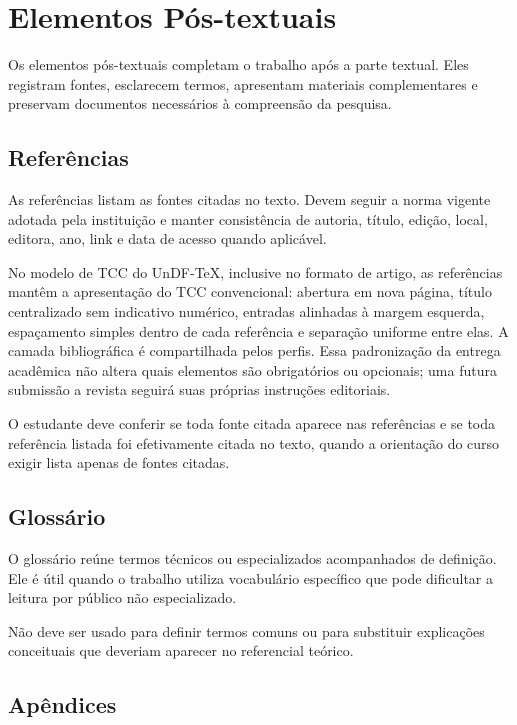 \chapter{Elementos Pós-textuais}

Os elementos pós-textuais completam o trabalho após a parte textual. Eles registram fontes, esclarecem termos, apresentam materiais complementares e preservam documentos necessários à compreensão da pesquisa.

\section{Referências}

As referências listam as fontes citadas no texto. Devem seguir a norma vigente adotada pela instituição e manter consistência de autoria, título, edição, local, editora, ano, link e data de acesso quando aplicável.

No modelo de TCC do UnDF-TeX, inclusive no formato de artigo, as referências mantêm a apresentação do TCC convencional: abertura em nova página, título centralizado sem indicativo numérico, entradas alinhadas à margem esquerda, espaçamento simples dentro de cada referência e separação uniforme entre elas. A camada bibliográfica é compartilhada pelos perfis. Essa padronização da entrega acadêmica não altera quais elementos são obrigatórios ou opcionais; uma futura submissão a revista seguirá suas próprias instruções editoriais.

O estudante deve conferir se toda fonte citada aparece nas referências e se toda referência listada foi efetivamente citada no texto, quando a orientação do curso exigir lista apenas de fontes citadas.

\section{Glossário}

O glossário reúne termos técnicos ou especializados acompanhados de definição. Ele é útil quando o trabalho utiliza vocabulário específico que pode dificultar a leitura por público não especializado.

Não deve ser usado para definir termos comuns ou para substituir explicações conceituais que deveriam aparecer no referencial teórico.

\section{Apêndices}

